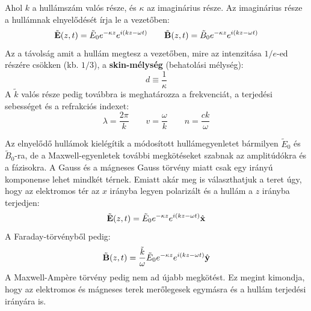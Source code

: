 \documentclass[a4paper,12pt]{article}
\begin{document}
Ahol $k$ a hullámszám valós része, és $\kappa$ az imaginárius része. Az imaginárius része a hullámnak elnyelődését írja le a vezetőben:
\begin{equation}
    \tilde{\bold{E}}(z, t) = \tilde{E}_0 e^{-\kappa z} e^{i(kz - \omega t)} \qquad \tilde{\bold{B}}(z, t) = \tilde{B}_0 e^{-\kappa z} e^{i(kz - \omega t)}
\end{equation}
Az a távolság amit a hullám megtesz a vezetőben, mire az intenzitása $1/e$-ed részére csökken (kb. $1/3$), a \textbf{skin-mélység} (behatolási mélység):
\begin{equation}
    d \equiv \frac{1}{\kappa}
\end{equation}
A $\tilde{k}$ valós része pedig továbbra is meghatározza a frekvenciát, a terjedési sebességet és a refrakciós indexet:
\begin{equation}
    \lambda = \frac{2\pi}{k} \qquad v = \frac{\omega}{k} \qquad n = \frac{ck}{\omega}
\end{equation}

Az elnyelődő hullámok kielégítik a módosított hullámegyenletet bármilyen $\tilde{E}_0$ és $\tilde{B}_0$-ra, de a Maxwell-egyenletek további megkötéseket szabnak az amplitúdókra és a fázisokra.
A Gauss és a mágneses Gauss törvény miatt csak egy irányú komponense lehet mindkét térnek. Emiatt akár meg is választhatjuk a teret úgy, hogy az elektromos tér az $x$ irányba legyen polarizált és a hullám a $z$ irányba terjedjen:
\begin{equation}
    \tilde{\bold{E}}(z, t) = \tilde{E}_0 e^{-\kappa z} e^{i(kz - \omega t)} \hat{\bold{x}}
\end{equation}
A Faraday-törvényből pedig:
\begin{equation}
    \tilde{\bold{B}}(z, t) = \frac{\tilde{k}}{\omega} \tilde{E}_0 e^{-\kappa z} e^{i(kz - \omega t)} \hat{\bold{y}}
\end{equation}
A Maxwell-Ampère törvény pedig nem ad újabb megkötést. Ez megint kimondja, hogy az elektromos és mágneses terek merőlegesek egymásra és a hullám terjedési irányára is.
\end{document}
